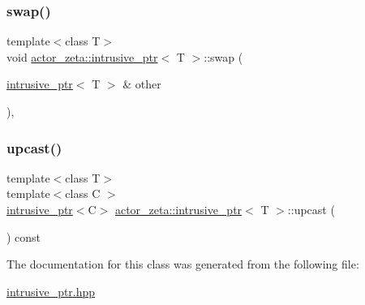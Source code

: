 \mbox{\label{classactor__zeta_1_1intrusive__ptr_ac0375a24b86c60080e7a19c843d898a6}} 
\subsubsection{\texorpdfstring{swap()}{swap()}}
{\footnotesize\ttfamily template$<$class T$>$ \\
void \hyperlink{classactor__zeta_1_1intrusive__ptr}{actor\+\_\+zeta\+::intrusive\+\_\+ptr}$<$ T $>$\+::swap (\begin{DoxyParamCaption}\item[{\hyperlink{classactor__zeta_1_1intrusive__ptr}{intrusive\+\_\+ptr}$<$ T $>$ \&}]{other }\end{DoxyParamCaption})\hspace{0.3cm}{\ttfamily [inline]}, {\ttfamily [noexcept]}}

\mbox{\label{classactor__zeta_1_1intrusive__ptr_a7ac6896bf79b51a33c44156db03d0c57}} 
\subsubsection{\texorpdfstring{upcast()}{upcast()}}
{\footnotesize\ttfamily template$<$class T$>$ \\
template$<$class C $>$ \\
\hyperlink{classactor__zeta_1_1intrusive__ptr}{intrusive\+\_\+ptr}$<$C$>$ \hyperlink{classactor__zeta_1_1intrusive__ptr}{actor\+\_\+zeta\+::intrusive\+\_\+ptr}$<$ T $>$\+::upcast (\begin{DoxyParamCaption}{ }\end{DoxyParamCaption}) const\hspace{0.3cm}{\ttfamily [inline]}}



The documentation for this class was generated from the following file\+:\begin{DoxyCompactItemize}
\item 
\hyperlink{intrusive__ptr_8hpp}{intrusive\+\_\+ptr.\+hpp}\end{DoxyCompactItemize}
